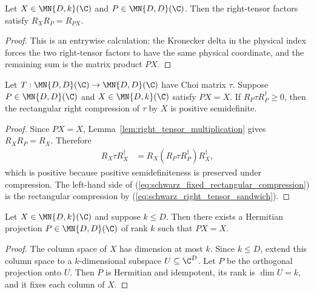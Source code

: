 \begin{lemma}
    \label{lem:right_tensor_multiplication}
    \leanok
    Let $X\in\MN{D,k}(\C)$ and $P\in\MN{D,D}(\C)$. Then the right-tensor
    factors satisfy $R_XR_P=R_{PX}$.
\end{lemma}

\begin{proof}
    \leanok
    This is an entrywise calculation: the Kronecker delta in the physical
    index forces the two right-tensor factors to have the same physical
    coordinate, and the remaining sum is the matrix product $PX$.
\end{proof}

\begin{lemma}
    \label{lem:square_sandwich_fixed_rectangular_compression}
    \leanok
    Let $T:\MN{D,D}(\C)\to\MN{D,D}(\C)$ have Choi matrix $\tau$. Suppose
    $P\in\MN{D,D}(\C)$ and $X\in\MN{D,k}(\C)$ satisfy $PX=X$. If
    $R_P\tau R_P^\dagger\ge0$, then the rectangular right compression of
    $\tau$ by $X$ is positive semidefinite.
\end{lemma}

\begin{proof}
    \leanok
    Since $PX=X$, Lemma~\ref{lem:right_tensor_multiplication} gives
    $R_XR_P=R_X$. Therefore
    \begin{align}
        R_X\tau R_X^\dagger
         & =R_X(R_P\tau R_P^\dagger)R_X^\dagger,
        \label{eq:schwarz_fixed_rectangular_compression}
    \end{align}
    which is positive because positive semidefiniteness is preserved under
    compression. The left-hand side of
    (\ref{eq:schwarz_fixed_rectangular_compression}) is the rectangular
    compression by (\ref{eq:schwarz_right_tensor_sandwich}).
\end{proof}

\begin{lemma}
    \label{lem:rank_k_projection_fixing_rectangular_factor}
    \leanok
    Let $X\in\MN{D,k}(\C)$ and suppose $k\le D$. Then there exists a
    Hermitian projection $P\in\MN{D,D}(\C)$ of rank $k$ such that $PX=X$.
\end{lemma}

\begin{proof}
    \leanok
    The column space of $X$ has dimension at most $k$. Since $k\le D$, extend
    this column space to a $k$-dimensional subspace $U\subseteq\C^D$. Let $P$
    be the orthogonal projection onto $U$. Then $P$ is Hermitian and
    idempotent, its rank is $\dim U=k$, and it fixes each column of $X$.
\end{proof}
